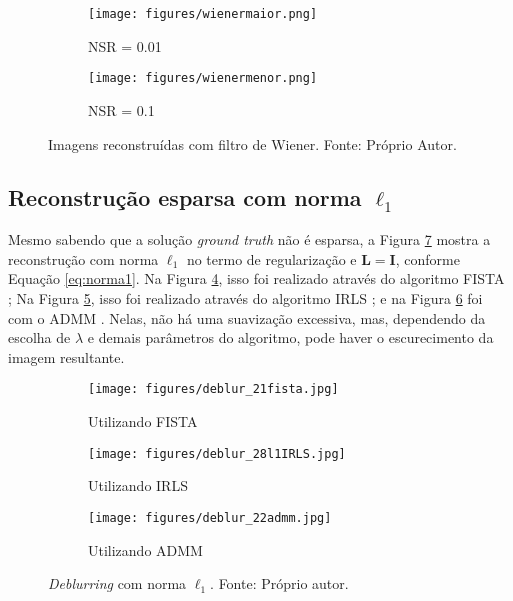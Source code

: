 \begin{figure}[H]
     \centering
     \begin{subfigure}[b]{0.35\textwidth}
         \centering
         \texttt{[image: figures/wienermaior.png]}
         \caption{NSR = 0.01}
         \label{fig:fftwienera}
     \end{subfigure}
     \begin{subfigure}[b]{0.35\textwidth}
         \centering
         \texttt{[image: figures/wienermenor.png]}
         \caption{NSR = 0.1}
         \label{fig:fftwienerb}
     \end{subfigure}
\caption[Imagens reconstruídas com filtro de Wiener.]{Imagens reconstruídas com filtro de Wiener. Fonte: Próprio Autor. }
\label{fig:fftwiener}
\end{figure}



\subsection{Reconstrução esparsa com norma $\ell_1$}

Mesmo sabendo que a solução \textit{ground truth} não é esparsa, a Figura \ref{fig:l1} mostra a reconstrução com norma $\ell_1$ no termo de regularização e $\mathbf{L}= \mathbf{I}$, conforme Equação \eqref{eq:norma1}. Na Figura \ref{fig:l1a}, isso foi realizado através do algoritmo FISTA \cite[Algoritmo 7.2]{aster2019parameter};  Na Figura \ref{fig:l1b}, isso foi realizado através do algoritmo IRLS \cite[Algoritmo 7.3]{aster2019parameter}; e na Figura \ref{fig:l1c} foi com o ADMM \cite[Algoritmo 7.4]{aster2019parameter}. Nelas, não há uma suavização excessiva, mas, dependendo da escolha de $\lambda$ e demais  parâmetros do algoritmo, pode haver o escurecimento da imagem resultante.  

\begin{figure}[H]
     \centering
     \begin{subfigure}[b]{0.32\textwidth}
         \centering
         \texttt{[image: figures/deblur\_21fista.jpg]}
         \caption{Utilizando FISTA}
         \label{fig:l1a}
     \end{subfigure}
               \hfill
     \begin{subfigure}[b]{0.32\textwidth}
         \centering
                  \texttt{[image: figures/deblur\_28l1IRLS.jpg]}
         \caption{Utilizando IRLS}
         \label{fig:l1b}
     \end{subfigure}  
     \hfill
     \begin{subfigure}[b]{0.32\textwidth}
         \centering
                  \texttt{[image: figures/deblur\_22admm.jpg]}
         \caption{Utilizando ADMM}
         \label{fig:l1c}
     \end{subfigure}   
\caption[\textit{Deblurring} com norma $\ell_1$.]{\textit{Deblurring} com norma $\ell_1$. Fonte: Próprio autor.}
\label{fig:l1}
\end{figure}




